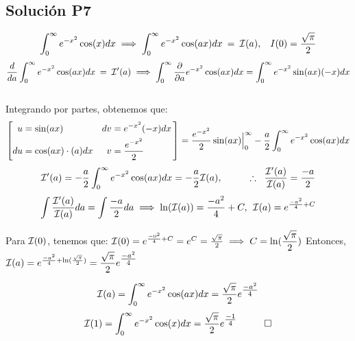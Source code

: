 \begin{CajaTitulo}{\begin{center}\subsection{Solución P7}\end{center}}
    \vspace{0.7cm}

    \[\int_{0}^{\infty}e^{-x^2}\cos(x)dx \implies \int_{0}^{\infty}e^{-x^2}\cos(ax)dx \:=\: \I(a) , \hspace{0.3cm}I(0) = \frac{\sqrt{\pi}}{2} \]
    \[\frac{d}{da}\int_{0}^{\infty}e^{-x^2}\cos(ax)dx \:= \: \I'(a) \implies \int_{0}^{\infty}\frac{\partial}{\partial a}e^{-x^2}\cos(ax)dx  = \int_{0}^{\infty}e^{-x^2}\sin(ax)(-x)dx\]
    \\
    Integrando por partes, obtenemos que:
    \[\PorPartes{\sin(ax)}{\cos(ax) \cdot (a) dx}{e^{-x^2}(-x)dx}{\frac{e^{-x^2}}{2}} =   \frac{e^{-x^2}}{2} \sin(ax) \Brackets_{0}^{\infty}  - \frac{a}{2}\int_{0}^{\infty}e^{-x^2}\cos(ax)dx     \]
    \[\I'(a) = - \frac{a}{2}\int_{0}^{\infty}e^{-x^2}\cos(ax)dx = - \frac{a}{2}\I(a), \hspace{1cm} \Porlo \hspace{0.2cm} \frac{\I'(a)}{\I(a)} = \frac{-a}{2}  \]
    \[\int \frac{\I'(a)}{\I(a)}da = \int \frac{-a}{2} da \implies \ln(\I(a)) = \frac{-a^2}{4} + C, \: \: \I(a) = e^{\frac{-a^2}{4} + C}\]

    Para $\I(0)$, tenemos que: $\I(0) = e^{\frac{-0^2}{4} + C} = e^{C} = \frac{\sqrt{\pi}}{2} \implies C = \ln(\mathlarger{\frac{\sqrt{\pi}}{2}})$ Entonces, $\I(a) = e^{\frac{-a^2}{4} + \ln(\frac{\sqrt{\pi}}{2})} = \mathlarger{ \frac{\sqrt{\pi}}{2}e^{\mathlarger{\frac{-a^2}{4}}}}$

    \[\I(a) = \int_{0}^{\infty}e^{-x^2}\cos(ax)dx = \frac{\sqrt{\pi}}{2}e^{\mathlarger{\frac{-a^2}{4}}}\]
    \[\I(1) = \int_{0}^{\infty}e^{-x^2}\cos(x)dx =  \frac{\sqrt{\pi}}{2}e^{\mathlarger{\frac{-1}{4}}}  \hspace{1cm}\square\]

    
    

\end{CajaTitulo}